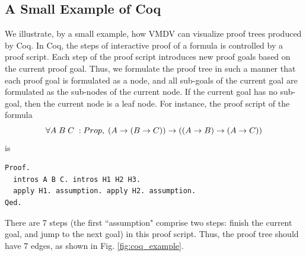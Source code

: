 \documentclass[runningheads]{llncs}
\newcommand\tool[1]{\textsf{#1}}
\newcommand\vmdv{\tool{VMDV}}
\begin{document}
\subsection{A Small Example of Coq}
We illustrate, by a small example, how \vmdv{} can visualize proof trees produced by Coq. In Coq, the steps of interactive proof of a formula is controlled by a proof script. Each step of the proof script introduces new proof goals based on the current proof goal. Thus, we formulate the proof tree in such a manner that each proof goal is formulated as a node, and all sub-goals of the current goal are formulated as the sub-nodes of the current node. If the current goal has no sub-goal, then the current node is a leaf node. For instance, the proof script of the formula
$${\small \forall A\; B\; C\; : Prop,\; (A\rightarrow(B\rightarrow C))\rightarrow ((A\rightarrow B)\rightarrow(A\rightarrow C))}$$
is
\begin{center}
\begin{verbatim}
Proof.
  intros A B C. intros H1 H2 H3.
  apply H1. assumption. apply H2. assumption.
Qed.
\end{verbatim}
\end{center}
There are 7 steps (the first ``assumption" comprise two steps: finish the current goal, and jump to the next goal) in this proof script. Thus, the proof tree should have 7 edges, as shown in Fig. \ref{fig:coq_example}.
 
\end{document}
